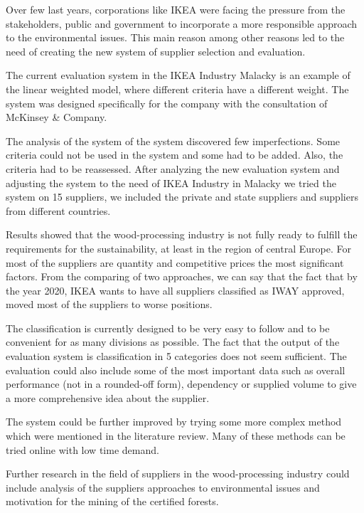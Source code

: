 \documentclass[oneside,12pt]{article}%
\begin{document}
Over few last years, corporations like IKEA were facing the pressure from the stakeholders, public and government to incorporate a more responsible approach to the environmental issues. This main reason among other reasons led to the need of creating the new system of supplier selection and evaluation. \par
The current evaluation system in the IKEA Industry Malacky is an example of the linear weighted model, where different criteria have a different weight. The system was designed specifically for the company with the consultation of McKinsey & Company. \par
The analysis of the system of the system discovered few imperfections. Some criteria could not be used in the system and some had to be added. Also, the criteria had to be reassessed. After analyzing the new evaluation system and adjusting the system to the need of IKEA Industry in Malacky we tried the system on 15 suppliers, we included the private and state suppliers and suppliers from different countries.  \par
Results showed that the wood-processing industry is not fully ready to fulfill the requirements for the sustainability, at least in the region of central Europe. For most of the suppliers are quantity and competitive prices the most significant factors. From the comparing of two approaches, we can say that the fact that by the year 2020, IKEA wants to have all suppliers classified as IWAY approved, moved most of the suppliers to worse positions. \par
The classification is currently designed to be very easy to follow and to be convenient for as many divisions as possible. The fact that the output of the evaluation system is classification in 5 categories does not seem sufficient. The evaluation could also include some of the most important data such as overall performance (not in a rounded-off form), dependency or supplied volume to give a more comprehensive idea about the supplier. \par
The system could be further improved by trying some more complex method which were mentioned in the literature review. Many of these methods can be tried online with low time demand. \par
Further research in the field of suppliers in the wood-processing industry could include analysis of the suppliers approaches to environmental issues and motivation for the mining of the certified forests.
\end{document}
